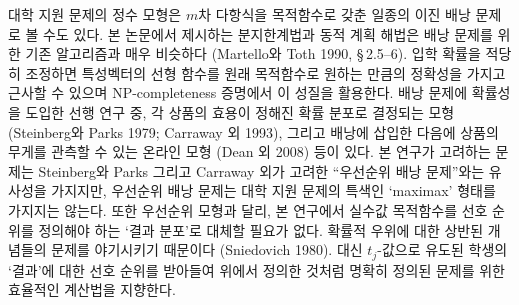 \documentclass[11pt]{article} %
\newif\ifen
\theoremstyle{definition}
\theoremstyle{definition}
\begin{document}
\ifen
The integer formulation of the college application problem can also be viewed as a kind of binary knapsack problem with a polynomial objective function of degree $m$. Our branch-and-bound and dynamic programming algorithms closely resemble existing algorithms for knapsack problems (Martello and Toth 1990, \S\,2.5--6). In fact, by manipulating the admissions probabilities, the objective function can be made to approximate a linear function of the characteristic vector to an arbitrary degree of accuracy, a fact that we exploit in our NP-completeness proof. Previous research has introduced various forms of stochasticity to the knapsack problem, including variants in which each item's utility takes a known probability distribution (Steinberg and Parks 1979; Carraway et al. 1993) and an online context in which the weight of each item is observed after insertion into the knapsack (Dean et al. 2008). Our problem superficially resembles the preference-order knapsack problem considered by Steinberg and Parks and Carraway et al., but these models lack the college application problem's singular ``maximax'' form. Additionally, unlike those models, we do not attempt to replace the real-valued objective function with a preference order over \emph{outcome distributions,} which introduces technical issues concerning competing notions of stochastic dominance (Sniedovich 1980). We take for granted the student's preferences over \emph{outcomes} (as encoded in the $t_j$-values), and focus instead on an efficient computational approach to the well-defined problem above.
\else
대학 지원 문제의 정수 모형은 $m$차 다항식을 목적함수로 갖춘 일종의 이진 배낭 문제로 볼 수도 있다. 본 논문에서 제시하는 분지한계법과 동적 계획 해법은 배낭 문제를 위한 기존 알고리즘과 매우 비슷하다 (Martello와 Toth 1990, \S\,2.5--6). 입학 확률을 적당히 조정하면 특성벡터의 선형 함수를 원래 목적함수로 원하는 만큼의 정확성을 가지고 근사할 수 있으며 NP-completeness 증명에서 이 성질을 활용한다. 배낭 문제에 확률성을 도입한 선행 연구 중, 각 상품의 효용이 정해진 확률 분포로 결정되는 모형(Steinberg와 Parks 1979; Carraway 외 1993), 그리고 배낭에 삽입한 다음에 상품의 무게를 관측할 수 있는 온라인 모형 (Dean 외 2008) 등이 있다. 본 연구가 고려하는 문제는 Steinberg와 Parks 그리고 Carraway 외가 고려한 ``우선순위 배낭 문제''와는 유사성을 가지지만, 우선순위 배낭 문제는 대학 지원 문제의 특색인 `maximax' 형태를 가지지는 않는다. 또한 우선순위 모형과 달리, 본 연구에서 실수값 목적함수를 선호 순위를 정의해야 하는 `결과 분포'로 대체할 필요가 없다. 확률적 우위에 대한 상반된 개념들의 문제를 야기시키기 때문이다 (Sniedovich 1980). 대신 $t_j$-값으로 유도된 학생의 `결과'에 대한 선호 순위를 받아들여 위에서 정의한 것처럼 명확히 정의된 문제를 위한 효율적인 계산법을 지향한다.
\fi
\end{document}

